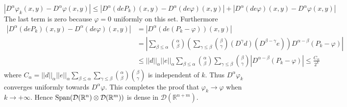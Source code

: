 \documentclass[11pt,a4paper]{article}
\newcommand{\ph}{\varphi}
\newcommand{\il}{\textit}
\newcommand{\R}{\mathbb{R}}
\newcommand{\1}{\mathbbm{1}}
\newcommand{\D}{\mathcal{D}}
\begin{document}
\[ |D^\alpha \ph_k(x,y) - D^\alpha \ph(x,y) | \leq |D^\alpha (deP_k)(x,y) - D^\alpha (de\ph)(x,y) | + |D^\alpha (de\ph)(x,y) - D^\alpha \ph(x,y)| \]
The last term is zero because $\ph =0 $ uniformly on this set. Furthermore
\begin{align*}
|D^\alpha (deP_k)(x,y) - D^\alpha (de\ph)(x,y) | & = |D^\alpha (de(P_k - \ph))(x,y)| \\
& = \left| \sum_{\beta \leq \alpha} \binom{\alpha}{\beta} \left(\sum_{\gamma \leq \beta} \binom{\beta}{\gamma} (D^\gamma d) (D^{\beta - \gamma} e) \right) D^{\alpha - \beta}(P_k - \ph) \right| \\
& \leq ||d||_\alpha ||e||_\alpha \sum_{\beta \leq \alpha} \binom{\alpha}{\beta} \sum_{\gamma \leq \beta} \binom{\beta}{\gamma} | D^{\alpha - \beta} (P_k - \ph) | \leq \frac{C_\alpha}{2^k}
\end{align*}
where $C_\alpha = ||d||_\alpha ||e||_\alpha \sum_{\beta \leq \alpha} \sum_{\gamma \leq \beta} \binom{\alpha}{\beta} \binom{\beta}{\gamma}$ is independent of $k$. Thus $D^\alpha \ph_k$ converges uniformly towards $D^\alpha \ph$. This completes the proof that $\ph_k \to \ph$ when $k \to +\infty$. Hence $\textnormal{Span}(\D(\R^n) \otimes \D(\R^m))$ is dense in $\D(\R^{n+m})$.
\end{document}
